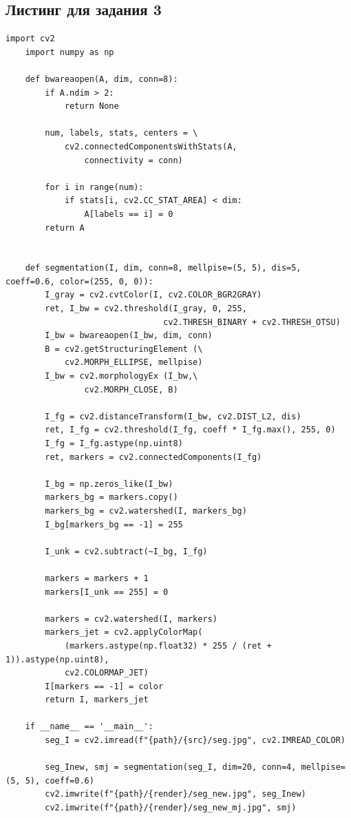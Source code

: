 \documentclass[a4paper, 12pt]{article}
\begin{document}
    \subsection{Листинг для задания 3}
    \begin{lstlisting}[label=task3, caption={Программа для сегментации изображения}]
    import cv2
    import numpy as np

    def bwareaopen(A, dim, conn=8):
        if A.ndim > 2:
            return None

        num, labels, stats, centers = \
            cv2.connectedComponentsWithStats(A,
                connectivity = conn)

        for i in range(num):
            if stats[i, cv2.CC_STAT_AREA] < dim:
                A[labels == i] = 0
        return A


    def segmentation(I, dim, conn=8, mellpise=(5, 5), dis=5, coeff=0.6, color=(255, 0, 0)):
        I_gray = cv2.cvtColor(I, cv2.COLOR_BGR2GRAY)
        ret, I_bw = cv2.threshold(I_gray, 0, 255,
                                cv2.THRESH_BINARY + cv2.THRESH_OTSU)
        I_bw = bwareaopen(I_bw, dim, conn)
        B = cv2.getStructuringElement (\
            cv2.MORPH_ELLIPSE, mellpise)
        I_bw = cv2.morphologyEx (I_bw,\
                cv2.MORPH_CLOSE, B)

        I_fg = cv2.distanceTransform(I_bw, cv2.DIST_L2, dis)
        ret, I_fg = cv2.threshold(I_fg, coeff * I_fg.max(), 255, 0)
        I_fg = I_fg.astype(np.uint8)
        ret, markers = cv2.connectedComponents(I_fg)

        I_bg = np.zeros_like(I_bw)
        markers_bg = markers.copy()
        markers_bg = cv2.watershed(I, markers_bg)
        I_bg[markers_bg == -1] = 255

        I_unk = cv2.subtract(~I_bg, I_fg)

        markers = markers + 1
        markers[I_unk == 255] = 0

        markers = cv2.watershed(I, markers)
        markers_jet = cv2.applyColorMap(
            (markers.astype(np.float32) * 255 / (ret + 1)).astype(np.uint8),
            cv2.COLORMAP_JET)
        I[markers == -1] = color
        return I, markers_jet

    if __name__ == '__main__':
        seg_I = cv2.imread(f"{path}/{src}/seg.jpg", cv2.IMREAD_COLOR)
        
        seg_Inew, smj = segmentation(seg_I, dim=20, conn=4, mellpise=(5, 5), coeff=0.6)
        cv2.imwrite(f"{path}/{render}/seg_new.jpg", seg_Inew)
        cv2.imwrite(f"{path}/{render}/seg_new_mj.jpg", smj)
    \end{lstlisting}
\end{document}
